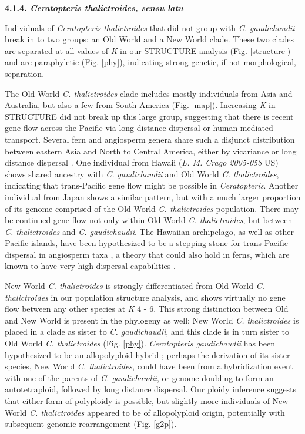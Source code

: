 \documentclass[12pt]{article}
\begin{document}
\begin{flushleft}
\textbf{4.1.4. \textit{Ceratopteris thalictroides, sensu latu}}

Individuals of \textit{Ceratopteris thalictroides} that did not group with \textit{C. gaudichaudii} break in to two groups: an Old World and a New World clade. These two clades are separated at all values of \textit{K} in our {\small{STRUCTURE}} analysis (Fig. \ref{structure}) and are paraphyletic (Fig. \ref{phy}), indicating strong genetic, if not morphological, separation.

The Old World \textit{C. thalictroides} clade includes mostly individuals from Asia and Australia, but also a few from South America (Fig. \ref{map}). Increasing \textit{K} in {\small{STRUCTURE}} did not break up this large group, suggesting that there is recent gene flow across the Pacific via long distance dispersal or human-mediated transport. Several fern and angiosperm genera share such a disjunct distribution between eastern Asia and North to Central America, either by vicariance or long distance dispersal \autocite{Kato1983, Les2003}. One individual from Hawaii (\textit{L. M. Crago 2005-058} US) shows shared ancestry with \textit{C. gaudichaudii} and Old World \textit{C. thalictroides}, indicating that trans-Pacific gene flow might be possible in \textit{Ceratopteris}. Another individual from Japan shows a similar pattern, but with a much larger proportion of its genome comprised of the Old World \textit{C. thalictroides} population. There may be continued gene flow not only within Old World \textit{C. thalictroides}, but between \textit{C. thalictroides} and \textit{C. gaudichaudii}. The Hawaiian archipelago, as well as other Pacific islands, have been hypothesized to be a stepping-stone for trans-Pacific dispersal in angiosperm taxa \autocite{Harbaugh2009, Wright2001}, a theory that could also hold in ferns, which are known to have very high dispersal capabilities \autocite{Barrington1993, Tryon1970}. 

New World \textit{C. thalictroides} is strongly differentiated from Old World \textit{C. thalictroides} in our population structure analysis, and shows virtually no gene flow between any other species at \textit{K} 4 - 6. This strong distinction between Old and New World is present in the phylogeny as well: New World \textit{C. thalictroides} is placed in a clade as sister to \textit{C. gaudichaudii}, and this clade is in turn sister to Old World \textit{C. thalictroides} (Fig. \ref{phy}). \textit{Ceratopteris gaudichaudii} has been hypothesized to be an allopolyploid hybrid \autocite{Adjie2007}; perhaps the derivation of its sister species, New World \textit{C. thalictroides}, could have been from a hybridization event with one of the parents of \textit{C. gaudichaudii}, or genome doubling to form an autotetraploid, followed by long distance dispersal. Our ploidy inference suggests that either form of polyploidy is possible, but slightly more individuals of New World \textit{C. thalictroides} appeared to be of allopolyploid origin, potentially with subsequent genomic rearrangement (Fig. \ref{g2p}).


\end{flushleft}
\end{document}
